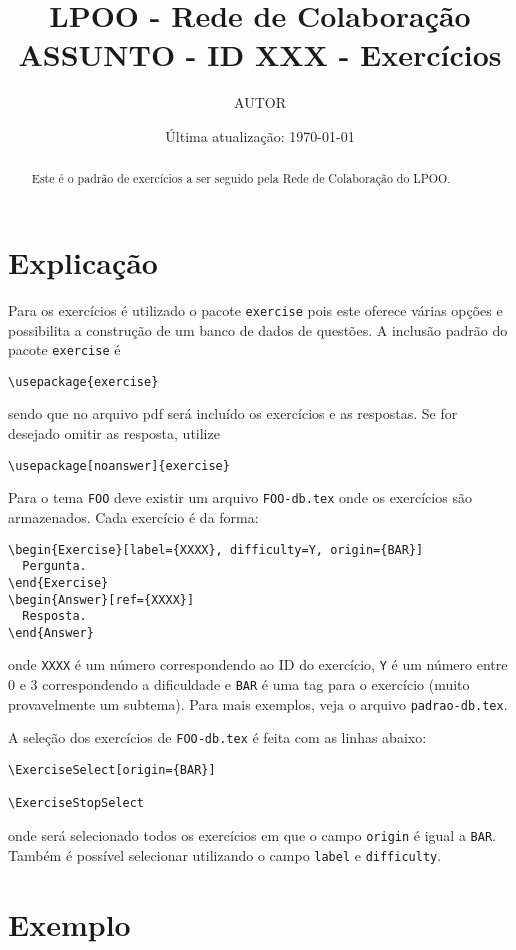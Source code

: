 \documentclass[a4paper,12pt]{article}
\title{ LPOO - Rede de Colaboração \\
ASSUNTO - ID XXX - Exercícios }
\author{ AUTOR }
\date{ Última atualização: \today }
\begin{document}
\maketitle

\begin{abstract}
Este é o padrão de exercícios a ser seguido pela Rede de Colaboração do LPOO.
\end{abstract}

\section{Explicação}
Para os exercícios é utilizado o pacote \verb+exercise+ pois este oferece várias
opções e possibilita a construção de um banco de dados de questões. A inclusão
padrão do pacote \verb+exercise+ é
\begin{verbatim}
\usepackage{exercise}
\end{verbatim}
sendo que no arquivo pdf será incluído os exercícios e as respostas. Se for
desejado omitir as resposta, utilize
\begin{verbatim}
\usepackage[noanswer]{exercise}
\end{verbatim}

Para o tema \verb+FOO+ deve existir um arquivo \verb+FOO-db.tex+ onde os
exercícios são armazenados. Cada exercício é da forma:
\begin{verbatim}
\begin{Exercise}[label={XXXX}, difficulty=Y, origin={BAR}]
  Pergunta.
\end{Exercise}
\begin{Answer}[ref={XXXX}]
  Resposta.
\end{Answer}
\end{verbatim}
onde \verb+XXXX+ é um número correspondendo ao ID do exercício, \verb+Y+ é um
número entre 0 e 3 correspondendo a dificuldade e \verb+BAR+ é uma tag para o
exercício (muito provavelmente um subtema). Para mais exemplos, veja o
arquivo \verb+padrao-db.tex+.

A seleção dos exercícios de \verb+FOO-db.tex+ é feita com as linhas abaixo:
\begin{verbatim}
\ExerciseSelect[origin={BAR}]

\ExerciseStopSelect
\end{verbatim}
onde será selecionado todos os exercícios em que o campo \verb+origin+ é igual a
\verb+BAR+. Também é possível selecionar utilizando o campo \verb+label+ e
\verb+difficulty+.

\section{Exemplo}
\ExerciseSelect[label={easy,medium,hard,veryhard,lstlisting}]

\ExerciseStopSelect
\end{document}
